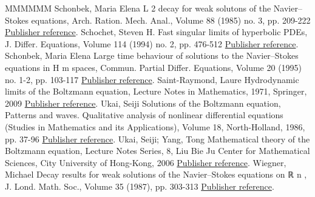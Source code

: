 \begin{thebibliography}{MMMMMM}
 Schonbek, Maria Elena L 2  decay for weak solutons of the Navier–Stokes equations, Arch. Ration. Mech. Anal., Volume 88 (1985) no. 3, pp. 209-222 \href{https://ahl.centre-mersenne.org/item/AHL_2020__3__561_0/#Schonbek24}{Publisher reference}.
 Schochet, Steven H. Fast singular limits of hyperbolic PDEs, J. Differ. Equations, Volume 114 (1994) no. 2, pp. 476-512 \href{https://ahl.centre-mersenne.org/item/AHL_2020__3__561_0/#Schochet}{Publisher reference}.
 Schonbek, Maria Elena Large time behaviour of solutions to the Navier–Stokes equations in H m  spaces, Commun. Partial Differ. Equations, Volume 20 (1995) no. 1-2, pp. 103-117 \href{https://ahl.centre-mersenne.org/item/AHL_2020__3__561_0/#Schonbek}{Publisher reference}.
 Saint-Raymond, Laure Hydrodynamic limits of the Boltzmann equation, Lecture Notes in Mathematics, 1971, Springer, 2009 \href{https://ahl.centre-mersenne.org/item/AHL_2020__3__561_0/#Saint-Raymond}{Publisher reference}.
 Ukai, Seiji Solutions of the Boltzmann equation, Patterns and waves. Qualitative analysis of nonlinear differential equations (Studies in Mathematics and its Applications), Volume 18, North-Holland, 1986, pp. 37-96 \href{https://ahl.centre-mersenne.org/item/AHL_2020__3__561_0/#Ukai}{Publisher reference}.
 Ukai, Seiji; Yang, Tong Mathematical theory of the Boltzmann equation, Lecture Notes Series, 8, Liu Bie Ju Center for Mathematical Sciences, City University of Hong-Kong, 2006 \href{https://ahl.centre-mersenne.org/item/AHL_2020__3__561_0/#Ukai-Yang}{Publisher reference}.
 Wiegner, Michael Decay results for weak solutions of the Navier–Stokes equations on ℝ n , J. Lond. Math. Soc., Volume 35 (1987), pp. 303-313 \href{https://ahl.centre-mersenne.org/item/AHL_2020__3__561_0/#wiegner}{Publisher reference}.
\end{thebibliography}
